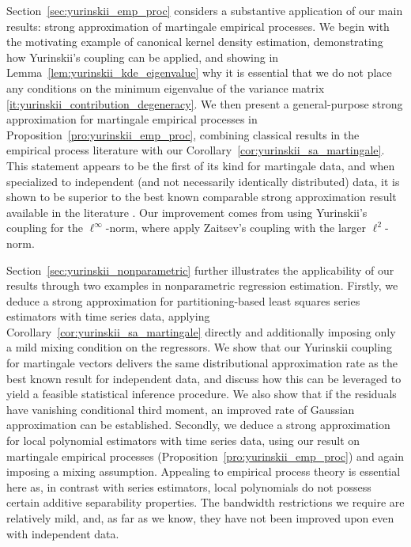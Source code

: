 \documentclass[11pt,lof]{puthesis}
\theoremstyle{break}
\theoremstyle{proof}
\begin{document}
Section~\ref{sec:yurinskii_emp_proc} considers a substantive application of our
main
results: strong approximation of martingale empirical processes. We begin with
the motivating example of canonical kernel density estimation, demonstrating
how Yurinskii's coupling can be applied, and showing in
Lemma~\ref{lem:yurinskii_kde_eigenvalue} why it is essential that we do not
place any
conditions on the minimum eigenvalue of the variance matrix
\ref{it:yurinskii_contribution_degeneracy}.
We then present a general-purpose strong
approximation for martingale empirical processes in
Proposition~\ref{pro:yurinskii_emp_proc}, combining classical results in the
empirical
process literature \citep{van1996weak} with our
Corollary~\ref{cor:yurinskii_sa_martingale}. This statement appears to be the
first of
its kind for martingale data, and when specialized to independent
(and not necessarily identically distributed) data, it is
shown to be superior to the best known comparable strong approximation result
available in the literature \citep{berthet2006revisiting}. Our improvement
comes from using Yurinskii's coupling for the $\ell^\infty$-norm, where
\citet{berthet2006revisiting} apply Zaitsev's coupling
\citep{zaitsev1987estimates, zaitsev1987gaussian} with the larger
$\ell^2$-norm.

Section~\ref{sec:yurinskii_nonparametric} further illustrates the applicability
of our
results through two examples in nonparametric regression estimation. Firstly,
we deduce a strong approximation for partitioning-based least squares series
estimators with time series data, applying
Corollary~\ref{cor:yurinskii_sa_martingale}
directly and additionally imposing only a mild mixing condition on the
regressors. We show that our Yurinskii coupling for martingale vectors delivers
the same distributional approximation rate as the best known result for
independent data, and discuss how this can be leveraged to yield a feasible
statistical inference procedure. We also show that if the residuals have
vanishing conditional third moment, an improved rate of Gaussian approximation
can be established. Secondly, we deduce a strong approximation for local
polynomial estimators with time series data,
using our result on martingale empirical processes
(Proposition~\ref{pro:yurinskii_emp_proc}) and again imposing a mixing
assumption.
Appealing to empirical process theory is essential here as, in contrast with
series estimators, local polynomials do not possess certain additive
separability properties. The bandwidth restrictions we require are relatively
mild, and, as far as we know, they have not been improved upon even with
independent data.
\end{document}
